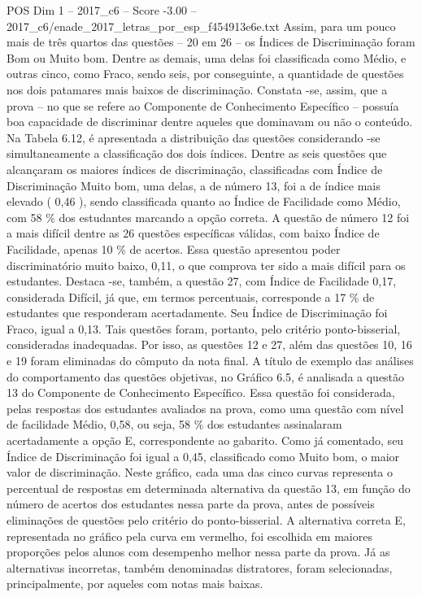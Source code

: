 \begin{textsample}{POS Dim 1 – 2017\_c6 – Score -3.00 – 2017\_c6/enade\_2017\_letras\_por\_esp\_f454913e6e.txt}
Assim, para um pouco mais de três quartos das questões – 20 em 26 – os Índices de Discriminação foram Bom ou Muito bom.
Dentre as demais, uma delas foi classificada como Médio, e outras cinco, como Fraco, sendo seis, por conseguinte, a quantidade de questões nos dois patamares mais baixos de discriminação.
Constata -se, assim, que a prova – no que se refere ao Componente de Conhecimento Específico – possuía boa capacidade de discriminar dentre aqueles que dominavam ou não o conteúdo.
Na Tabela 6.12, é apresentada a distribuição das questões considerando -se simultaneamente a classificação dos dois índices.
Dentre as seis questões que alcançaram os maiores índices de discriminação, classificadas com Índice de Discriminação Muito bom, uma delas, a de número 13, foi a de índice mais elevado ( 0,46 ), sendo classificada quanto ao Índice de Facilidade como Médio, com 58 \% dos estudantes marcando a opção correta.
A questão de número 12 foi a mais difícil dentre as 26 questões específicas válidas, com baixo Índice de Facilidade, apenas 10 \% de acertos.
Essa questão apresentou poder discriminatório muito baixo, 0,11, o que comprova ter sido a mais difícil para os estudantes.
Destaca -se, também, a questão 27, com Índice de Facilidade 0,17, considerada Difícil, já que, em termos percentuais, corresponde a 17 \% de estudantes que responderam acertadamente.
Seu Índice de Discriminação foi Fraco, igual a 0,13.
Tais questões foram, portanto, pelo critério ponto-bisserial, consideradas inadequadas.
Por isso, as questões 12 e 27, além das questões 10, 16 e 19 foram eliminadas do cômputo da nota final.
A título de exemplo das análises do comportamento das questões objetivas, no Gráfico 6.5, é analisada a questão 13 do Componente de Conhecimento Específico.
Essa questão foi considerada, pelas respostas dos estudantes avaliados na prova, como uma questão com nível de facilidade Médio, 0,58, ou seja, 58 \% dos estudantes assinalaram acertadamente a opção E, correspondente ao gabarito.
Como já comentado, seu Índice de Discriminação foi igual a 0,45, classificado como Muito bom, o maior valor de discriminação.
Neste gráfico, cada uma das cinco curvas representa o percentual de respostas em determinada alternativa da questão 13, em função do número de acertos dos estudantes nessa parte da prova, antes de possíveis eliminações de questões pelo critério do ponto-bisserial.
A alternativa correta E, representada no gráfico pela curva em vermelho, foi escolhida em maiores proporções pelos alunos com desempenho melhor nessa parte da prova.
Já as alternativas incorretas, também denominadas distratores, foram selecionadas, principalmente, por aqueles com notas mais baixas.

\end{textsample}
